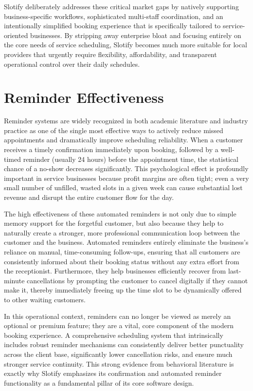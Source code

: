 Slotify deliberately addresses these critical market gaps by natively supporting business-specific workflows, sophisticated multi-staff coordination, and an intentionally simplified booking experience that is specifically tailored to service-oriented businesses. By stripping away enterprise bloat and focusing entirely on the core needs of service scheduling, Slotify becomes much more suitable for local providers that urgently require flexibility, affordability, and transparent operational control over their daily schedules.

\section{Reminder Effectiveness}
Reminder systems are widely recognized in both academic literature and industry practice as one of the single most effective ways to actively reduce missed appointments and dramatically improve scheduling reliability. When a customer receives a timely confirmation immediately upon booking, followed by a well-timed reminder (usually 24 hours) before the appointment time, the statistical chance of a no-show decreases significantly. This psychological effect is profoundly important in service businesses because profit margins are often tight; even a very small number of unfilled, wasted slots in a given week can cause substantial lost revenue and disrupt the entire customer flow for the day.

The high effectiveness of these automated reminders is not only due to simple memory support for the forgetful customer, but also because they help to naturally create a stronger, more professional communication loop between the customer and the business. Automated reminders entirely eliminate the business's reliance on manual, time-consuming follow-ups, ensuring that all customers are consistently informed about their booking status without any extra effort from the receptionist. Furthermore, they help businesses efficiently recover from last-minute cancellations by prompting the customer to cancel digitally if they cannot make it, thereby immediately freeing up the time slot to be dynamically offered to other waiting customers.

In this operational context, reminders can no longer be viewed as merely an optional or premium feature; they are a vital, core component of the modern booking experience. A comprehensive scheduling system that intrinsically includes robust reminder mechanisms can consistently deliver better punctuality across the client base, significantly lower cancellation risks, and ensure much stronger service continuity. This strong evidence from behavioral literature is exactly why Slotify emphasizes its confirmation and automated reminder functionality as a fundamental pillar of its core software design.

